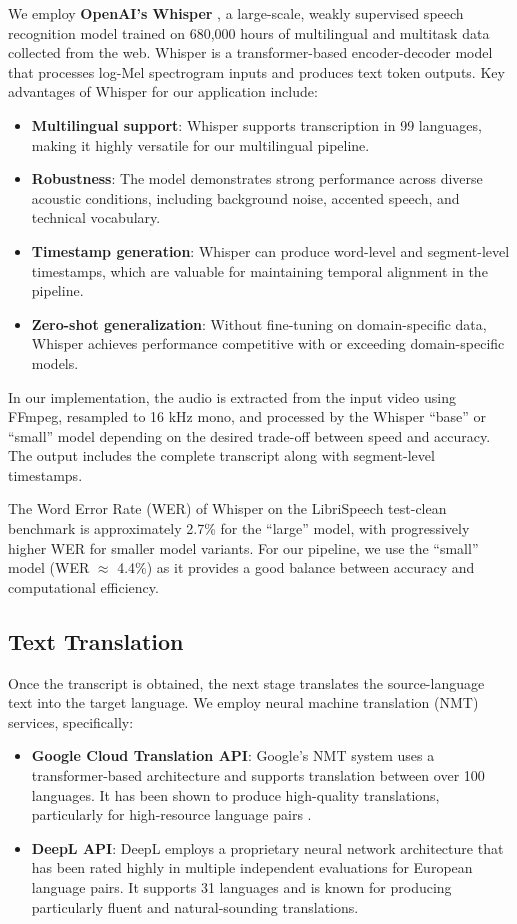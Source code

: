 \documentclass[conference]{IEEEtran}
\begin{document}
We employ \textbf{OpenAI's Whisper} \cite{b3}, a large-scale, weakly supervised speech recognition model trained on 680,000 hours of multilingual and multitask data collected from the web. Whisper is a transformer-based encoder-decoder model that processes log-Mel spectrogram inputs and produces text token outputs. Key advantages of Whisper for our application include:

\begin{itemize}
    \item \textbf{Multilingual support}: Whisper supports transcription in 99 languages, making it highly versatile for our multilingual pipeline.
    \item \textbf{Robustness}: The model demonstrates strong performance across diverse acoustic conditions, including background noise, accented speech, and technical vocabulary.
    \item \textbf{Timestamp generation}: Whisper can produce word-level and segment-level timestamps, which are valuable for maintaining temporal alignment in the pipeline.
    \item \textbf{Zero-shot generalization}: Without fine-tuning on domain-specific data, Whisper achieves performance competitive with or exceeding domain-specific models.
\end{itemize}

In our implementation, the audio is extracted from the input video using FFmpeg, resampled to 16 kHz mono, and processed by the Whisper ``base'' or ``small'' model depending on the desired trade-off between speed and accuracy. The output includes the complete transcript along with segment-level timestamps.

The Word Error Rate (WER) of Whisper on the LibriSpeech test-clean benchmark is approximately 2.7\% for the ``large'' model, with progressively higher WER for smaller model variants. For our pipeline, we use the ``small'' model (WER $\approx$ 4.4\%) as it provides a good balance between accuracy and computational efficiency.

\subsection{Text Translation}

Once the transcript is obtained, the next stage translates the source-language text into the target language. We employ neural machine translation (NMT) services, specifically:

\begin{itemize}
    \item \textbf{Google Cloud Translation API}: Google's NMT system uses a transformer-based architecture and supports translation between over 100 languages. It has been shown to produce high-quality translations, particularly for high-resource language pairs \cite{b11}.
    \item \textbf{DeepL API}: DeepL employs a proprietary neural network architecture that has been rated highly in multiple independent evaluations for European language pairs. It supports 31 languages and is known for producing particularly fluent and natural-sounding translations.
\end{itemize}
\end{document}
